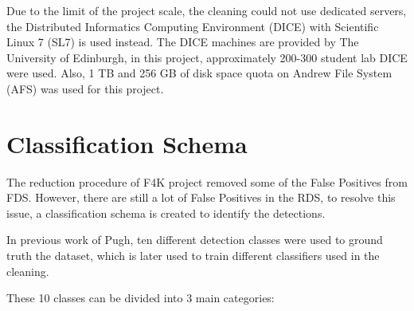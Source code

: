 \documentclass[bsc,logo,twoside,fullspacing,parskip]{infthesis}
\begin{document}
Due to the limit of the project scale, the cleaning could not use dedicated servers, the Distributed Informatics Computing Environment (DICE) with Scientific Linux 7 (SL7) is used instead. 
The DICE machines are provided by The University of Edinburgh, in this project, approximately 200-300 student lab DICE were used.
Also, 1 TB and 256 GB of disk space quota on Andrew File System (AFS) was used for this project.

\section{Classification Schema}
\label{sec:schema}

The reduction procedure of F4K project removed some of the False Positives from FDS. 
However, there are still a lot of False Positives in the RDS, to resolve this issue, a classification schema is created to identify the detections.

In previous work of Pugh\cite{P1}, ten different detection classes were used to ground truth the dataset, which is later used to train different classifiers used in the cleaning. 

These 10 classes can be divided into 3 main categories:
\end{document}

